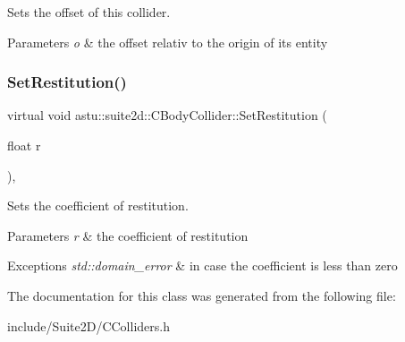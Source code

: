 Sets the offset of this collider.


\begin{DoxyParams}{Parameters}
{\em o} & the offset relativ to the origin of its entity \\
\hline
\end{DoxyParams}
\mbox{\label{classastu_1_1suite2d_1_1CBodyCollider_a28a503811fbdcc29fe1fa6204f82bd8a}} 
\subsubsection{\texorpdfstring{Set\+Restitution()}{SetRestitution()}}
{\footnotesize\ttfamily virtual void astu\+::suite2d\+::\+C\+Body\+Collider\+::\+Set\+Restitution (\begin{DoxyParamCaption}\item[{float}]{r }\end{DoxyParamCaption})\hspace{0.3cm}{\ttfamily [inline]}, {\ttfamily [virtual]}}

Sets the coefficient of restitution.


\begin{DoxyParams}{Parameters}
{\em r} & the coefficient of restitution \\
\hline
\end{DoxyParams}

\begin{DoxyExceptions}{Exceptions}
{\em std\+::domain\+\_\+error} & in case the coefficient is less than zero \\
\hline
\end{DoxyExceptions}


The documentation for this class was generated from the following file\+:\begin{DoxyCompactItemize}
\item 
include/\+Suite2\+D/C\+Colliders.\+h\end{DoxyCompactItemize}
